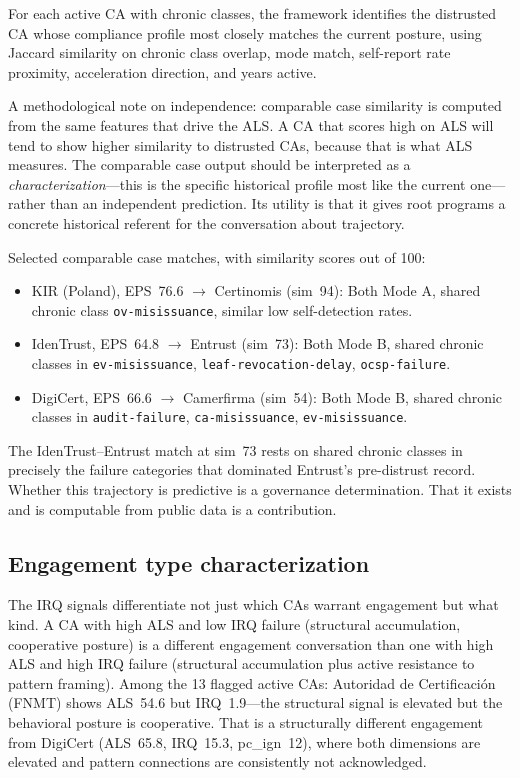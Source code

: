 \documentclass[10pt,twocolumn,letterpaper]{article}
\begin{document}
For each active CA with chronic classes, the framework identifies the distrusted CA
whose compliance profile most closely matches the current posture, using Jaccard
similarity on chronic class overlap, mode match, self-report rate proximity, acceleration
direction, and years active.

A methodological note on independence: comparable case similarity is computed from the
same features that drive the ALS. A CA that scores high on ALS will tend to show higher
similarity to distrusted CAs, because that is what ALS measures. The comparable case
output should be interpreted as a \textit{characterization}---this is the specific
historical profile most like the current one---rather than an independent prediction.
Its utility is that it gives root programs a concrete historical referent for the
conversation about trajectory.

Selected comparable case matches, with similarity scores out of 100:

\begin{itemize}[noitemsep,topsep=2pt]
\item KIR (Poland), EPS~76.6 $\to$ Certinomis (sim~94): Both Mode A, shared
  chronic class \texttt{ov-misissuance}, similar low self-detection rates.
\item IdenTrust, EPS~64.8 $\to$ Entrust (sim~73): Both Mode B, shared chronic
  classes in \texttt{ev-misissuance}, \texttt{leaf-revocation-delay}, \texttt{ocsp-failure}.
\item DigiCert, EPS~66.6 $\to$ Camerfirma (sim~54): Both Mode B, shared chronic
  classes in \texttt{audit-failure}, \texttt{ca-misissuance}, \texttt{ev-misissuance}.
\end{itemize}

The IdenTrust--Entrust match at sim~73 rests on shared chronic classes in precisely the
failure categories that dominated Entrust's pre-distrust record. Whether this trajectory
is predictive is a governance determination. That it exists and is computable from
public data is a contribution.

\subsection{Engagement type characterization}

The IRQ signals differentiate not just which CAs warrant engagement but what kind. A CA
with high ALS and low IRQ failure (structural accumulation, cooperative posture) is a
different engagement conversation than one with high ALS and high IRQ failure (structural
accumulation plus active resistance to pattern framing). Among the 13 flagged active CAs:
Autoridad de Certificaci\'{o}n (FNMT) shows ALS~54.6 but IRQ~1.9---the structural signal is
elevated but the behavioral posture is cooperative. That is a structurally different
engagement from DigiCert (ALS~65.8, IRQ~15.3, pc\_ign~12), where both dimensions are
elevated and pattern connections are consistently not acknowledged.
\end{document}
